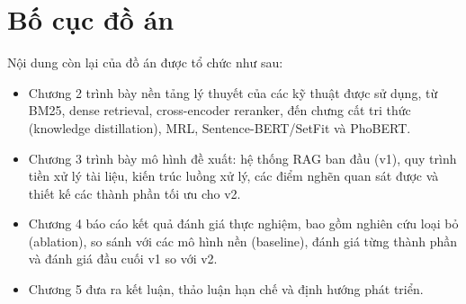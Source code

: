\documentclass[../DoAn.tex]{subfiles}
\begin{document}
\section{Bố cục đồ án}
\label{section:1.5}

Nội dung còn lại của đồ án được tổ chức như sau:

\begin{itemize}
    \item Chương 2 trình bày nền tảng lý thuyết của các kỹ thuật được sử dụng, từ BM25, dense retrieval, cross-encoder reranker, đến chưng cất tri thức (knowledge distillation), MRL, Sentence-BERT/SetFit và PhoBERT.

    \item Chương 3 trình bày mô hình đề xuất: hệ thống RAG ban đầu (v1), quy trình tiền xử lý tài liệu, kiến trúc luồng xử lý, các điểm nghẽn quan sát được và thiết kế các thành phần tối ưu cho v2.

    \item Chương 4 báo cáo kết quả đánh giá thực nghiệm, bao gồm nghiên cứu loại bỏ (ablation), so sánh với các mô hình nền (baseline), đánh giá từng thành phần và đánh giá đầu cuối v1 so với v2.

    \item Chương 5 đưa ra kết luận, thảo luận hạn chế và định hướng phát triển.
\end{itemize}
\end{document}
